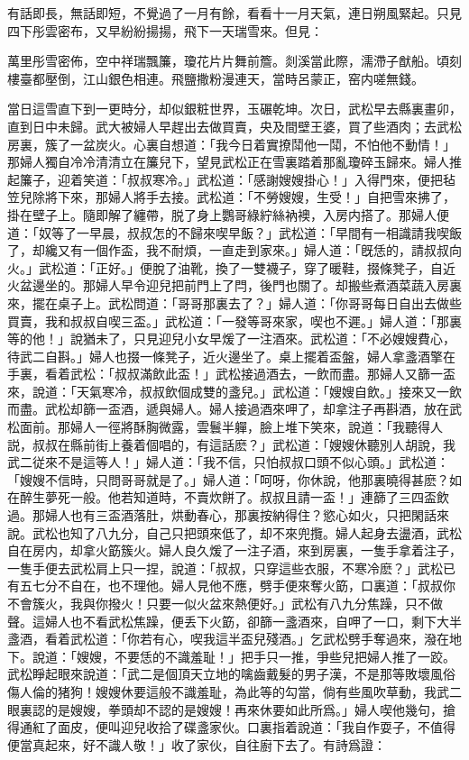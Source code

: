有話即長，無話即短，不覺過了一月有餘，看看十一月天氣，連日朔風緊起。只見四下彤雲密布，又早紛紛揚揚，飛下一天瑞雪來。但見：　

\begin{myquote}
萬里彤雪密佈，空中祥瑞飄簾，瓊花片片舞前簷。剡溪當此際，濡滯子猷船。頃刻樓臺都壓倒，江山銀色相連。飛鹽撒粉漫連天，當時呂蒙正，窑内嗟無錢。
\end{myquote}

當日這雪直下到一更時分，却似銀粧世界，玉碾乾坤。次日，武松早去縣裏畫卯，直到日中未歸。武大被婦人早趕出去做買賣，央及間壁王婆，買了些酒肉；去武松房裏，簇了一盆炭火。心裏自想道：「我今日着實撩鬦他一鬦，不怕他不動情！」那婦人獨自冷冷清清立在簾兒下，望見武松正在雪裏踏着那亂瓊碎玉歸來。婦人推起簾子，迎着笑道：「叔叔寒冷。」武松道：「感謝嫂嫂掛心！」入得門來，便把毡笠兒除將下來，那婦人將手去接。武松道：「不勞嫂嫂，生受！」自把雪來拂了，掛在壁子上。隨即解了纏帶，脱了身上鸚哥綠紵絲衲襖，入房内搭了。那婦人便道：「奴等了一早晨，叔叔怎的不歸來喫早飯？」武松道：「早間有一相識請我喫飯了，却纔又有一個作盃，我不耐煩，一直走到家來。」婦人道：「旣恁的，請叔叔向火。」武松道：「正好。」便脫了油靴，換了一雙襪子，穿了暖鞋，掇條凳子，自近火盆邊坐的。那婦人早令迎兒把前門上了閂，後門也關了。却搬些煮酒菜蔬入房裏來，擺在桌子上。武松問道：「哥哥那裏去了？」婦人道：「你哥哥每日自出去做些買賣，我和叔叔自喫三盃。」武松道：「一發等哥來家，喫也不遲。」婦人道：「那裏等的他！」說猶未了，只見迎兒小女早煖了一注酒來。武松道：「不必嫂嫂費心，待武二自斟。」婦人也掇一條凳子，近火邊坐了。桌上擺着盃盤，婦人拿盞酒擎在手裏，看着武松：「叔叔滿飲此盃！」武松接過酒去，一飲而盡。那婦人又篩一盃來，說道：「天氣寒冷，叔叔飲個成雙的盞兒。」武松道：「嫂嫂自飲。」接來又一飲而盡。武松却篩一盃酒，遞與婦人。婦人接過酒來呷了，却拿注子再斟酒，放在武松面前。那婦人一徑將酥胸微露，雲鬟半軃，臉上堆下笑來，說道：「我聽得人説，叔叔在縣前街上養着個唱的，有這話麽？」武松道：「嫂嫂休聽別人胡說，我武二従來不是這等人！」婦人道：「我不信，只怕叔叔口頭不似心頭。」武松道：「嫂嫂不信時，只問哥哥就是了。」婦人道：「呵呀，你休說，他那裏曉得甚麽？如在醉生夢死一般。他若知道時，不賣炊餅了。叔叔且請一盃！」連篩了三四盃飲過。那婦人也有三盃酒落肚，烘動春心，那裏按納得住？慾心如火，只把閑話來說。武松也知了八九分，自己只把頭來低了，却不來兜攬。婦人起身去盪酒，武松自在房内，却拿火筯簇火。婦人良久煖了一注子酒，來到房裏，一隻手拿着注子，一隻手便去武松肩上只一捏，說道：「叔叔，只穿這些衣服，不寒冷麽？」武松已有五七分不自在，也不理他。婦人見他不應，劈手便來奪火筯，口裏道：「叔叔你不會簇火，我與你撥火！只要一似火盆來熱便好。」武松有八九分焦躁，只不做聲。這婦人也不看武松焦躁，便丢下火筯，卻篩一盞酒來，自呷了一口，剩下大半盞酒，看着武松道：「你若有心，喫我這半盃兒殘酒。」乞武松劈手奪過來，潑在地下。說道：「嫂嫂，不要恁的不識羞耻！」把手只一推，爭些兒把婦人推了一跤。武松睜起眼來說道：「武二是個頂天立地的噙齒戴髮的男子漢，不是那等敗壞風俗傷人倫的猪狗！嫂嫂休要這般不識羞耻，為此等的勾當，倘有些風吹草動，我武二眼裏認的是嫂嫂，拳頭却不認的是嫂嫂！再來休要如此所爲。」婦人喫他幾句，搶得通紅了面皮，便叫迎兒收拾了碟盞家伙。口裏指着說道：「我自作耍子，不值得便當真起來，好不識人敬！」收了家伙，自往廚下去了。有詩爲證：

